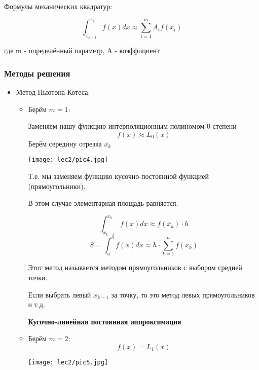 \documentclass[12pt]{article}
\begin{document}
Формулы механических квадратур:

\[
  \int_{x_{k-1}}^{x_k} f(x)dx \approx \sum_{i=1}^m A_i f(x_i)
\] 

где m - определённый параметр,
A - коэффициент


\subsubsection{Методы решения}
\begin{itemize}
  \item Метод Ньютона-Котеса:
        \begin{itemize}
          \item Берём \( m=1 \):

                Заменяем нашу функцию интерполяционным полиномом 0 степени
                \[
                    f(x) \approx L_0(x)         
                \] 
                Берём середину отрезка \( \overline{x_k} \)

                \begin{center}
                  \texttt{[image: lec2/pic4.jpg]}
                \end{center}

                Т.е. мы заменяем функцию кусочно-постоянной функцией
                (прямоугольники).

                В этом случае элементарная площадь равняется:

                \[
                  \int_{x_{k-1}}^{x_k} f(x)dx \approx
                  f(\overline{x}_k) \cdot h
                \] 
                \[
                  S = \int_{a}^{b} f(x)dx \approx
                  h \cdot \sum_{k=1}^{n}f(\overline{x}_k)
                \] 

                Этот метод называется методом прямоугольников
                с выбором средней точки.  

                Если выбрать левый \( x_{k-1} \) за точку, то это метод
                левых прямоугольников и т.д.

                \textbf{Кусочно-линейная постоянная аппроксимация}
          \item Берём \( m=2 \):
            \[
              f(x) = L_1(x)
            \] 

            \begin{center}
              \texttt{[image: lec2/pic5.jpg]}
            \end{center}


\end{itemize}
\end{itemize}
\end{document}
